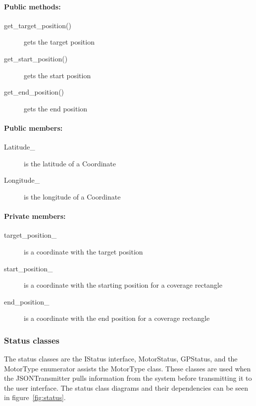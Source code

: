 \paragraph{Public methods:}
\begin{adjustwidth}{2.5em}{0pt}\begin{description}
		\item [get_target_position()] gets the target position
		\item [get_start_position()] gets the start position
		\item [get_end_position()] gets the end position
\end{description}\end{adjustwidth}

\paragraph{Public members:}
\begin{adjustwidth}{2.5em}{0pt}\begin{description}
		\item [Latitude_] is the latitude of a Coordinate
		\item [Longitude_] is the longitude of a Coordinate
\end{description}\end{adjustwidth}

\paragraph{Private members:}
\begin{adjustwidth}{2.5em}{0pt}\begin{description}
		\item [target_position_] is a coordinate with the target position
		\item [start_position_] is a coordinate with the starting position for a coverage rectangle
		\item [end_position_] is a coordinate with the end position for a coverage rectangle
\end{description}\end{adjustwidth}

\subsubsection{Status classes}

The status classes are the IStatus interface, MotorStatus, GPStatus, and the MotorType enumerator assists the MotorType class. These classes are used when the JSONTransmitter pulls information from the system before transmitting it to the user interface. The status class diagrams and their dependencies can be seen in figure~\ref{fig:status}.

